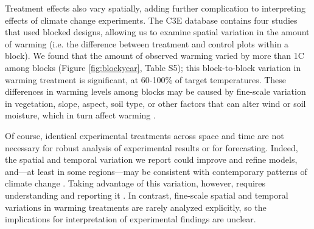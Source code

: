 \documentclass{article}
\begin{document}
\par Treatment effects also vary spatially, adding further complication to interpreting effects of climate change experiments. The C3E database contains four studies that used blocked designs, allowing us to examine spatial variation in the amount of warming (i.e. the difference between treatment and control plots within a block). We found that the amount of observed warming varied by more than 1\degree C among blocks (Figure \ref{fig:blockyear}, Table S5); this block-to-block variation in warming treatment is significant, at 60-100\% of target temperatures. These differences in warming levels among blocks may be caused by fine-scale variation in vegetation, slope, aspect, soil type, or other factors that can alter wind or soil moisture, which in turn affect warming \citep{peterjohn1993,kimball2005,kimball2008,hoeppner2012,rollinson2015}. %

\par Of course, identical experimental treatments across space and time are not necessary for robust analysis of experimental results or for forecasting. Indeed, the spatial and temporal variation we report could improve and refine models, and---at least in some regions---may be consistent with contemporary patterns of climate change \citep{ipcc2013}. Taking advantage of this variation, however, requires understanding and reporting it \citep[e.g.,][]{milcu2016}. In contrast, fine-scale spatial and temporal variations in warming treatments are rarely analyzed explicitly, so the implications for interpretation of experimental findings are unclear.
\end{document}

